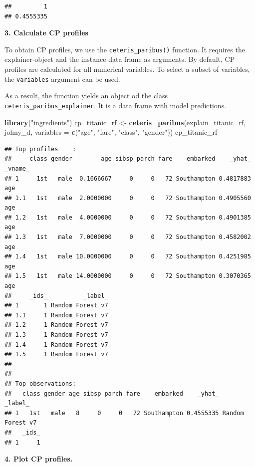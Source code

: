 \documentclass[12pt,]{krantz}
\newenvironment{Shaded}{\begin{snugshade}}{\end{snugshade}}
\newcommand{\DataTypeTok}[1]{\textcolor[rgb]{0.13,0.29,0.53}{#1}}
\newcommand{\KeywordTok}[1]{\textcolor[rgb]{0.13,0.29,0.53}{\textbf{#1}}}
\newcommand{\NormalTok}[1]{#1}
\newcommand{\StringTok}[1]{\textcolor[rgb]{0.31,0.60,0.02}{#1}}
\theoremstyle{definition}
\theoremstyle{definition}
\theoremstyle{definition}
\theoremstyle{remark}
\begin{document}
\begin{verbatim}
##         1 
## 0.4555335
\end{verbatim}

\textbf{3. Calculate CP profiles}

To obtain CP profiles, we use the \texttt{ceteris\_paribus()} function.
It requires the explainer-object and the instance data frame as
arguments. By default, CP profiles are calculated for all numerical
variables. To select a subset of variables, the \texttt{variables}
argument can be used.

As a result, the function yields an object od the class
\texttt{ceteris\_paribus\_explainer}. It is a data frame with model
predictions.

\begin{Shaded}
\begin{Highlighting}[]
\KeywordTok{library}\NormalTok{(}\StringTok{"ingredients"}\NormalTok{)}
\NormalTok{cp_titanic_rf <-}\StringTok{ }\KeywordTok{ceteris_paribus}\NormalTok{(explain_titanic_rf, johny_d, }
                            \DataTypeTok{variables =} \KeywordTok{c}\NormalTok{(}\StringTok{"age"}\NormalTok{, }\StringTok{"fare"}\NormalTok{, }\StringTok{"class"}\NormalTok{, }\StringTok{"gender"}\NormalTok{))}
\NormalTok{cp_titanic_rf}
\end{Highlighting}
\end{Shaded}

\begin{verbatim}
## Top profiles    : 
##     class gender        age sibsp parch fare    embarked    _yhat_ _vname_
## 1     1st   male  0.1666667     0     0   72 Southampton 0.4817883     age
## 1.1   1st   male  2.0000000     0     0   72 Southampton 0.4905560     age
## 1.2   1st   male  4.0000000     0     0   72 Southampton 0.4901385     age
## 1.3   1st   male  7.0000000     0     0   72 Southampton 0.4582002     age
## 1.4   1st   male 10.0000000     0     0   72 Southampton 0.4251985     age
## 1.5   1st   male 14.0000000     0     0   72 Southampton 0.3070365     age
##     _ids_          _label_
## 1       1 Random Forest v7
## 1.1     1 Random Forest v7
## 1.2     1 Random Forest v7
## 1.3     1 Random Forest v7
## 1.4     1 Random Forest v7
## 1.5     1 Random Forest v7
## 
## 
## Top observations:
##   class gender age sibsp parch fare    embarked    _yhat_          _label_
## 1   1st   male   8     0     0   72 Southampton 0.4555335 Random Forest v7
##   _ids_
## 1     1
\end{verbatim}

\textbf{4. Plot CP profiles.}
\end{document}
